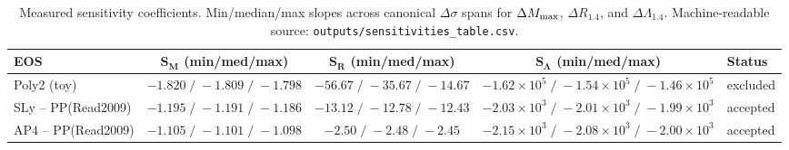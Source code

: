 \begin{table}[ht]
\centering
\caption{Measured sensitivity coefficients. Min/median/max slopes across canonical $\Delta\sigma$ spans for $\Delta M_{\rm max}$, $\Delta R_{1.4}$, and $\Delta\Lambda_{1.4}$. Machine-readable source: \texttt{outputs/sensitivities\_table.csv}.}
\label{tab:sensitivities}
\begin{tabular}{l c c c l}
\hline
\textbf{EOS} & \(\mathbf{S_M}\) (min/med/max) & \(\mathbf{S_R}\) (min/med/max) & \(\mathbf{S_\Lambda}\) (min/med/max) & \textbf{Status} \\
\hline
Poly2 (toy) & \(-1.820\;/\;-1.809\;/\;-1.798\) & \(-56.67\;/\;-35.67\;/\;-14.67\) & \(-1.62\times10^{5}\;/\;-1.54\times10^{5}\;/\;-1.46\times10^{5}\) & excluded \\
SLy -- PP(Read2009) & \(-1.195\;/\;-1.191\;/\;-1.186\) & \(-13.12\;/\;-12.78\;/\;-12.43\) & \(-2.03\times10^{3}\;/\;-2.01\times10^{3}\;/\;-1.99\times10^{3}\) & accepted \\
AP4 -- PP(Read2009) & \(-1.105\;/\;-1.101\;/\;-1.098\) & \(-2.50\;/\;-2.48\;/\;-2.45\) & \(-2.15\times10^{3}\;/\;-2.08\times10^{3}\;/\;-2.00\times10^{3}\) & accepted \\
\hline
\end{tabular}
\end{table}

